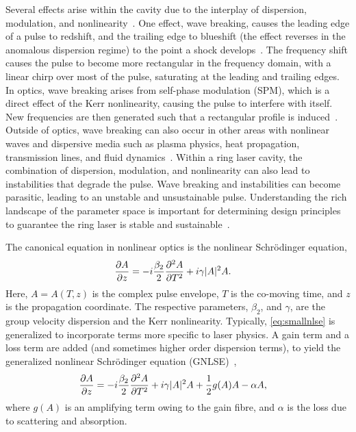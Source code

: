\documentclass[9pt,twocolumn,twoside]{osajnl}
\newcommand{\pdiff}[3][\hspace{-0.5pt}]{\frac{\partial^{#1}#2}{\partial{#3}^{#1}}} %
\begin{document}
Several effects arise within the cavity due to the interplay of dispersion, modulation, and nonlinearity~\cite{bohun2015, coen1997, lapre2019, meng2020, oktem2010, shao2019, woodward2018}. One effect, wave breaking, causes the leading edge of a pulse to redshift, and the trailing edge to blueshift (the effect reverses in the anomalous dispersion regime) to the point a shock develops~\cite{anderson1992, rothenberg1989a, rothenberg1989b, tomlinson1984, tomlinson1985}. The frequency shift causes the pulse to become more rectangular in the frequency domain, with a linear chirp over most of the pulse, saturating at the leading and trailing edges. In optics, wave breaking arises from self-phase modulation (SPM), which is a direct effect of the Kerr nonlinearity, causing the pulse to interfere with itself. New frequencies are then generated such that a rectangular profile is induced~\cite{agrawal2013, woodward2018}. Outside of optics, wave breaking can also occur in other areas with nonlinear waves and dispersive media such as plasma physics, heat propagation, transmission lines, and fluid dynamics~\cite{coen1997, rothenberg1989b}. Within a ring laser cavity, the combination of dispersion, modulation, and nonlinearity can also lead to instabilities that degrade the pulse. Wave breaking and instabilities can become parasitic, leading to an unstable and unsustainable pulse. Understanding the rich landscape of the parameter space is important for determining design principles to guarantee the ring laser is stable and sustainable~\cite{bohun2015, burgoyneemail, finot2008, lapre2019, woodward2018}.

The canonical equation in nonlinear optics is the nonlinear Schr\"odinger equation,
\begin{align}
	\pdiff{A}{z} &= - i \frac{\beta_2}{2}\pdiff[2]{A}{T} + i \gamma |A|^2 A.
	\label{eq:smallnlse}
\end{align}
Here, $A = A(T, z)$ is the complex pulse envelope, $T$ is the co-moving time, and $z$ is the propagation coordinate. The respective parameters, $\beta_2$, and $\gamma$, are the group velocity dispersion and the Kerr nonlinearity. Typically, \eqref{eq:smallnlse} is generalized to incorporate terms more specific to laser physics. A gain term and a loss term are added (and sometimes higher order dispersion terms), to yield the generalized nonlinear Schr\"odinger equation (GNLSE)~\cite{agrawal2013, bohun2015, finot2008, peng2018, shtyrina2017, yarutkina2013},
	\begin{align}
	\pdiff{A}{z} &= - i \frac{\beta_2}{2}\pdiff[2]{A}{T} + i \gamma |A|^2 A + \frac{1}{2}g(A) A - \alpha A,
	\label{eq:nlse}
\end{align}
where $g(A)$ is an amplifying term owing to the gain fibre, and $\alpha$ is the loss due to scattering and absorption.
\end{document}
